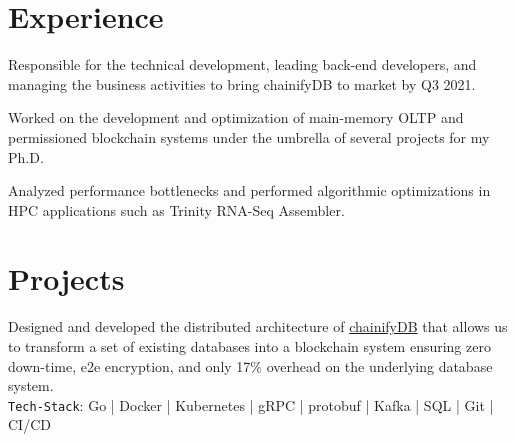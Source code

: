 \documentclass[]{deedy-resume-openfont}
\begin{document}
\begin{minipage}[t]{0.66\textwidth}
	

\section{Experience}

Responsible for the technical development, leading back-end developers, and managing the business activities to bring chainifyDB to market by Q3 2021.

\sectionsep

Worked on the development and optimization of main-memory OLTP and permissioned blockchain systems under the umbrella of several projects for my Ph.D.

\sectionsep
{}
Analyzed performance bottlenecks and performed algorithmic optimizations in HPC applications such as Trinity RNA-Seq Assembler.

\sectionsep



\section{Projects}
Designed and developed the distributed architecture of \href{www.chainifydb.com}{chainifyDB} that allows us to transform a set of existing databases into a 
blockchain system ensuring zero down-time, e2e encryption, and only 17\% overhead on the underlying database system.\\
\texttt{Tech-Stack}: Go | Docker | Kubernetes | gRPC | protobuf | Kafka | SQL | Git | CI/CD


\end{minipage}
\end{document}
